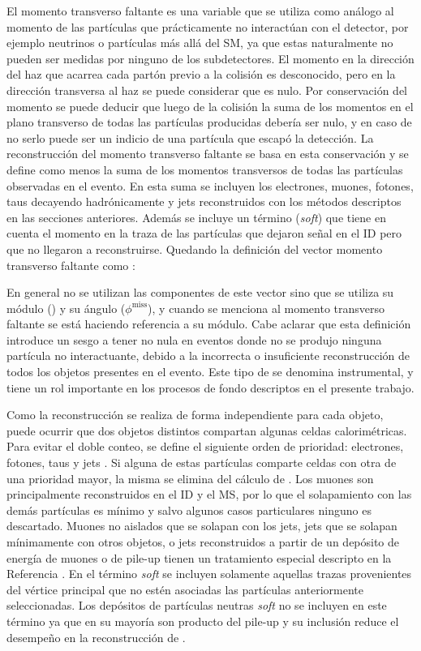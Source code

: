 El momento transverso faltante es una variable que se utiliza como análogo al momento de las partículas que prácticamente no interactúan con el detector, por ejemplo neutrinos o partículas más allá del SM, ya que estas naturalmente no pueden ser medidas por ninguno de los subdetectores. El momento en la dirección del haz que acarrea cada partón previo a la colisión es desconocido, pero en la dirección transversa al haz se puede considerar que es nulo. Por conservación del momento se puede deducir que luego de la colisión la suma de los momentos en el plano transverso de todas las partículas producidas debería ser nulo, y en caso de no serlo puede ser un indicio de una partícula que escapó la detección. La reconstrucción del momento transverso faltante se basa en esta conservación y se define como menos la suma de los momentos transversos de todas las partículas observadas en el evento. En esta suma se incluyen los electrones, muones, fotones, taus decayendo hadrónicamente y jets reconstruidos con los métodos descriptos en las secciones anteriores. Además se incluye un término (\textit{soft}) que tiene en cuenta el momento en la traza de las partículas que dejaron señal en el ID pero que no llegaron a reconstruirse. Quedando la definición del vector momento transverso faltante como \cite{PERF-2016-07}:


En general no se utilizan las componentes de este vector sino que se utiliza su módulo (\met) y su ángulo ($\phi^{\text{miss}}$), y cuando se menciona al momento transverso faltante se está haciendo referencia a su módulo. Cabe aclarar que esta definición introduce un sesgo a tener \met no nula en eventos donde no se produjo ninguna partícula no interactuante, debido a la incorrecta o insuficiente reconstrucción de todos los objetos presentes en el evento. Este tipo de \met se denomina instrumental, y tiene un rol importante en los procesos de fondo descriptos en el presente trabajo.

Como la reconstrucción se realiza de forma independiente para cada objeto, puede ocurrir que dos objetos distintos compartan algunas celdas calorimétricas. Para evitar el doble conteo, se define el siguiente orden de prioridad: electrones, fotones, taus y jets \cite{PERF-2011-07, PERF-2014-04}. Si alguna de estas partículas comparte celdas con otra de una prioridad mayor, la misma se elimina del cálculo de \met. Los muones son principalmente reconstruidos en el ID y el MS, por lo que el solapamiento con las demás partículas es mínimo y salvo algunos casos particulares ninguno es descartado. Muones no aislados que se solapan con los jets, jets que se solapan mínimamente con otros objetos, o jets reconstruidos a partir de un depósito de energía de muones o de pile-up tienen un tratamiento especial descripto en la Referencia \cite{PERF-2016-07}. En el término \textit{soft} se incluyen solamente aquellas trazas provenientes del vértice principal que no estén asociadas las partículas anteriormente seleccionadas. Los depósitos de partículas neutras \textit{soft} no se incluyen en este término ya que en su mayoría son producto del pile-up y su inclusión reduce el desempeño en la reconstrucción de \met. 

